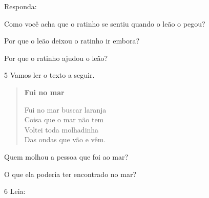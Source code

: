 Responda:

\begin{escolha}
\item Como você acha que o ratinho se sentiu quando o leão o pegou?


\item Por que o leão deixou o ratinho ir embora?


\item Por que o ratinho ajudou o leão?

\end{escolha}

\num{5} Vamos ler o texto a seguir.

\begin{myquote}
\begin{verse}
\textbf{Fui no mar}

Fui no mar buscar laranja\\
Coisa que o mar não tem\\
Voltei toda molhadinha\\
Das ondas que vão e vêm.
\end{verse}

\end{myquote}

\begin{escolha}
\item Quem molhou a pessoa que foi ao mar?


\item O que ela poderia ter encontrado no mar?

\end{escolha}

\num{6} Leia:


